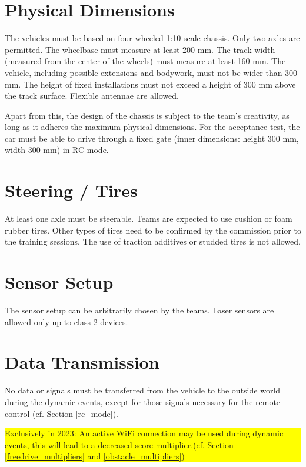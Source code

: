 \documentclass[a4paper]{report}
\newlength\colorboxwidth
\begin{document}
\section{Physical Dimensions}

The vehicles must be based on four-wheeled 1:10 scale chassis. Only two axles are permitted. The wheelbase must measure at least 200 mm. The track width (measured from the center of the wheels) must measure at least 160 mm. The vehicle, including possible extensions and bodywork, must not be wider than 300 mm. The height of fixed installations must not exceed a height of 300 mm above the track surface. Flexible antennae are allowed.

Apart from this, the design of the chassis is subject to the team’s creativity, as long as it adheres the maximum physical dimensions. For the acceptance test, the car must be able to drive through a fixed gate (inner dimensions: height 300 mm, width 300 mm) in RC-mode. 

\section{Steering / Tires}

At least one axle must be steerable. Teams are expected to use cushion or foam rubber tires. Other types of tires need to be confirmed by the commission prior to the training sessions. The use of traction additives or studded tires is not allowed. 

\section{Sensor Setup}

The sensor setup can be arbitrarily chosen by the teams. Laser sensors are allowed only up to class 2 devices. 

\section{Data Transmission}

No data or signals must be transferred from the vehicle to the outside world during the dynamic events, except for those signals necessary for the remote control (cf. Section \ref{rc_mode}).\\
\colorbox{yellow}{\parbox{\colorboxwidth}{Exclusively in 2023:  An active WiFi connection may be used during dynamic events, this will lead to a decreased score multiplier.(cf. Section \ref{freedrive_multipliers} and \ref{obstacle_multipliers})}}
\end{document}
